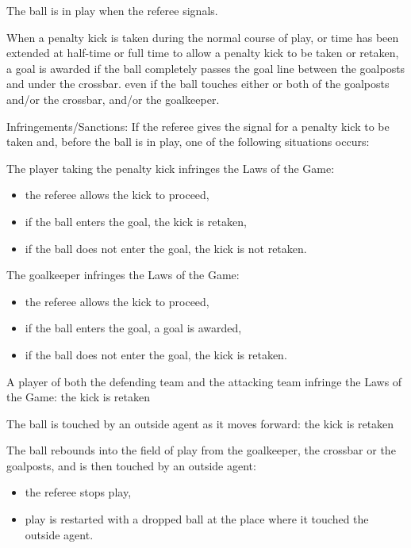 \documentclass[12pt]{hurocup}
\begin{document}
\begin{lawlist}
\item The ball is in play when the referee signals.

\item When a penalty kick is taken during the normal course of play,
  or time has been extended at half-time or full time to allow a
  penalty kick to be taken or retaken, a goal is awarded if the ball
  completely passes the goal line between the goalposts and under the
  crossbar.  even if the ball touches either or both of the goalposts
  and/or the crossbar, and/or the goalkeeper.

\item Infringements/Sanctions: \label{pk-infringements} If the referee gives the signal for a
  penalty kick to be taken and, before the ball is in play, one of the
  following situations occurs:

  The player taking the penalty kick infringes the Laws of the Game:
  \begin{itemize}
  \item the referee allows the kick to proceed,
  \item if the ball enters the goal, the kick is retaken,
  \item if the ball does not enter the goal, the kick is not retaken.
  \end{itemize}

  The goalkeeper infringes the Laws of the Game:
  \begin{itemize}
  \item the referee allows the kick to proceed,
  \item if the ball enters the goal, a goal is awarded,
  \item if the ball does not enter the goal, the kick is retaken.
  \end{itemize}

  A player of both the defending team and the attacking team
  infringe the Laws of the Game: the kick is retaken

  The ball is touched by an outside agent as it moves forward: the
  kick is retaken

  The ball rebounds into the field of play from the goalkeeper,
  the crossbar or the goalposts, and is then touched by an outside agent:
  \begin{itemize}
  \item the referee stops play,
  \item play is restarted with a dropped ball at the place where it
    touched the outside agent. 
  \end{itemize}
\end{lawlist}
\end{document}
